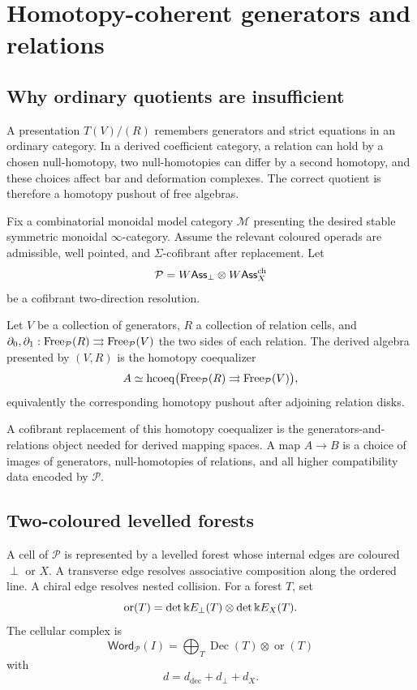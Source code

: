 \chapter{Homotopy-coherent generators and relations}\label{chap:presentations}

\section{Why ordinary quotients are insufficient}
A presentation \(T(V)/(R)\) remembers generators and strict equations in an ordinary category.  In a derived coefficient category, a relation can hold by a chosen null-homotopy, two null-homotopies can differ by a second homotopy, and these choices affect bar and deformation complexes.  The correct quotient is therefore a homotopy pushout of free algebras.

Fix a combinatorial monoidal model category \(\mathcal M\) presenting the desired stable symmetric monoidal \(\infty\)-category.  Assume the relevant coloured operads are admissible, well pointed, and \(\Sigma\)-cofibrant after replacement.  Let
\[
 \mathcal P=W\mathsf{Ass}_\perp\otimes W\mathsf{Ass}^{\mathrm{ch}}_X
\]
be a cofibrant two-direction resolution.

\begin{definition}
Let \(V\) be a collection of generators, \(R\) a collection of relation cells, and \(\partial_0,\partial_1:\operatorname{Free}_{\mathcal P}(R)\rightrightarrows\operatorname{Free}_{\mathcal P}(V)\) the two sides of each relation.  The derived algebra presented by \((V,R)\) is the homotopy coequalizer
\[
 A\simeq\operatorname*{hcoeq}
 \bigl(\operatorname{Free}_{\mathcal P}(R)\rightrightarrows\operatorname{Free}_{\mathcal P}(V)\bigr),
\]
equivalently the corresponding homotopy pushout after adjoining relation disks.
\end{definition}

A cofibrant replacement of this homotopy coequalizer is the generators-and-relations object needed for derived mapping spaces.  A map \(A\to B\) is a choice of images of generators, null-homotopies of relations, and all higher compatibility data encoded by \(\mathcal P\).

\section{Two-coloured levelled forests}
A cell of \(\mathcal P\) is represented by a levelled forest whose internal edges are coloured \(\perp\) or \(X\).  A transverse edge resolves associative composition along the ordered line.  A chiral edge resolves nested collision.  For a forest \(T\), set
\[
 \operatorname{or}(T)=
 \det\Bbbk E_\perp(T)\otimes\det\Bbbk E_X(T).
\]
The cellular complex is
\[
 \mathsf{Word}_{\mathcal P}(I)
 =\bigoplus_T\operatorname{Dec}(T)\otimes\operatorname{or}(T)
\]
with
\[
 d=d_{\mathrm{dec}}+d_\perp+d_X.
\]

